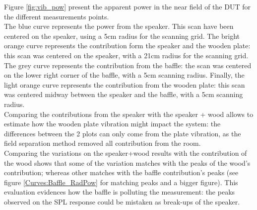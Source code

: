 \documentclass{report}
\begin{document}
Figure \ref{fig:vib_pow} present the apparent power in the near field of the DUT for the different measurements points. \\
The blue curve represents the power from the speaker. This scan have been centered on the speaker, using a 5cm radius for the scanning grid. The bright orange curve represents the contribution form the speaker and the wooden plate: this scan was centered on the speaker, with a 21cm radius for the scanning grid. The grey curve represents the contribution from the baffle: the scan was centered on the lower right corner of the baffle, with a 5cm scanning radius. Finally, the light orange curve represents the contribution from the wooden plate: this scan was centered midway between the speaker and the baffle, with a 5cm scanning radius. \\

Comparing the contributions from the speaker with the speaker + wood allows to estimate how the wooden plate vibration might impact the system: the differences between the 2 plots can only come from the plate vibration, as the field separation method removed all contribution from the room. \\

Comparing the variations on the speaker+wood results with the contribution of the wood shows that some of the variation matches with the peaks of the wood's contribution; whereas other matches with the baffle contribution's peaks (see figure \ref{Curves:Baffle_RadPow} for matching peaks and a bigger figure). This evaluation evidences how the baffle is polluting the measurement: the peaks observed on the SPL response could be mistaken as break-ups of the speaker.  \\
\end{document}
